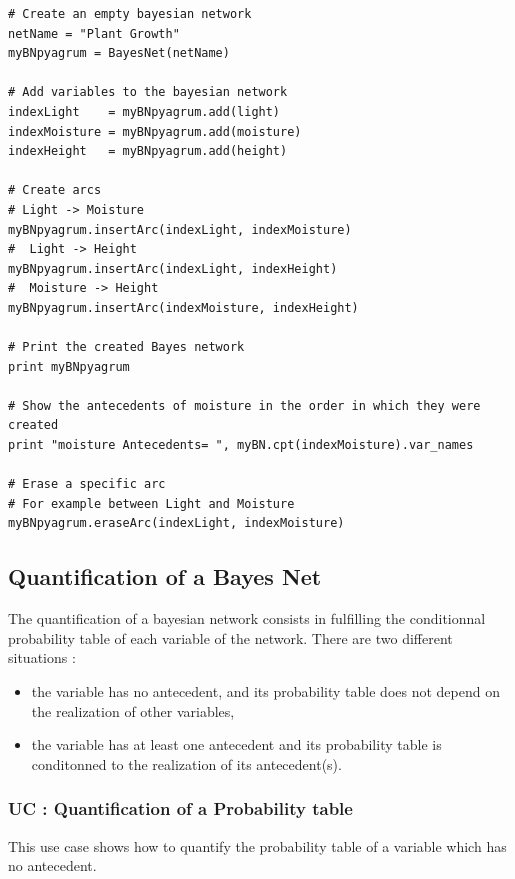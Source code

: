 \begin{lstlisting}
# Create an empty bayesian network
netName = "Plant Growth"
myBNpyagrum = BayesNet(netName)

# Add variables to the bayesian network
indexLight    = myBNpyagrum.add(light)
indexMoisture = myBNpyagrum.add(moisture)
indexHeight   = myBNpyagrum.add(height)

# Create arcs
# Light -> Moisture
myBNpyagrum.insertArc(indexLight, indexMoisture)
#  Light -> Height
myBNpyagrum.insertArc(indexLight, indexHeight)
#  Moisture -> Height
myBNpyagrum.insertArc(indexMoisture, indexHeight)

# Print the created Bayes network
print myBNpyagrum

# Show the antecedents of moisture in the order in which they were created
print "moisture Antecedents= ", myBN.cpt(indexMoisture).var_names

# Erase a specific arc
# For example between Light and Moisture
myBNpyagrum.eraseArc(indexLight, indexMoisture)
\end{lstlisting}






\newpage \subsection{Quantification of a Bayes Net} \label{BayesNetQuantification}


The quantification of a bayesian network consists in fulfilling the conditionnal probability table of each variable of the network. There are two different situations : 
\begin{itemize}
   \item the variable has no antecedent, and its probability table does not depend on the realization of other variables,
   \item the variable has at least one antecedent and its probability table is conditonned to the realization of its antecedent(s).
\end{itemize}


\subsubsection{UC : Quantification of a Probability table }

This use case shows how to quantify the probability table of a variable which has no antecedent.\\

